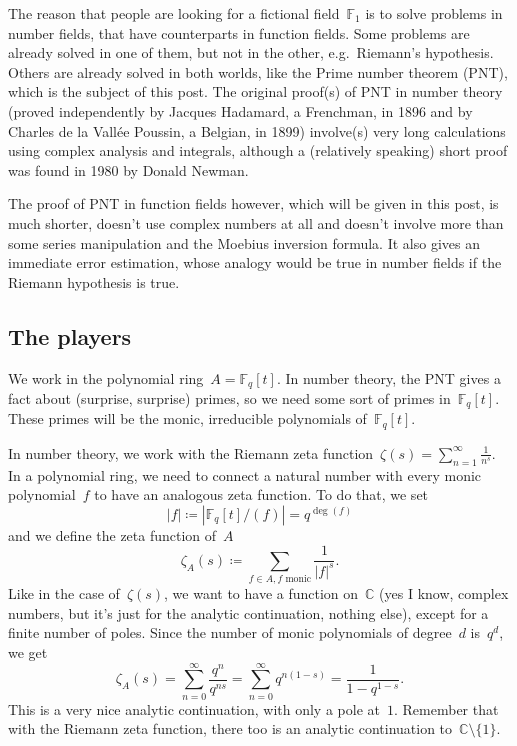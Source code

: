The reason that people are looking for a fictional field~$\mathbb{F}_1$ is to solve problems in number fields, that have counterparts in function fields. Some problems are already solved in one of them, but not in the other, e.g.\ Riemann's hypothesis. Others are already solved in both worlds, like the Prime number theorem (PNT), which is the subject of this post. The original proof(s) of PNT in number theory (proved independently by Jacques Hadamard, a Frenchman, in 1896 and by Charles de la Vall\'ee Poussin, a Belgian, in 1899) involve(s) very long calculations using complex analysis and integrals, although a (relatively speaking) short proof was found in 1980 by Donald Newman.

The proof of PNT in function fields however, which will be given in this post, is much shorter, doesn't use complex numbers at all and doesn't involve more than some series manipulation and the Moebius inversion formula. It also gives an immediate error estimation, whose analogy would be true in number fields if the Riemann hypothesis is true.

\subsection{The players}
We work in the polynomial ring~$A = \mathbb{F}_q[t]$. In number theory, the PNT gives a fact about (surprise, surprise) primes, so we need some sort of primes in $\mathbb{F}_q[t]$. These primes will be the monic, irreducible polynomials of~$\mathbb{F}_q[t]$.

In number theory, we work with the Riemann zeta function~$\zeta(s) = \sum_{n=1}^\infty \frac{1}{n^s}$. In a polynomial ring, we need to connect a natural number with every monic polynomial~$f$ to have an analogous zeta function. To do that, we set
\begin{equation}
  |f|\coloneqq|\mathbb{F}_q[t]/(f)| = q^{\deg(f)} 
\end{equation}
and we define the zeta function of~$A$
\begin{equation}
  \zeta_A(s)\coloneqq \sum_{f \in A,f \text{ monic}} \frac{1}{|f|^s}. 
\end{equation}
Like in the case of~$\zeta(s)$, we want to have a function on~$\mathbb{C}$ (yes I know, complex numbers, but it's just for the analytic continuation, nothing else), except for a finite number of poles. Since the number of monic polynomials of degree~$d$ is~$q^d$, we get
\begin{equation}
  \zeta_A(s) = \sum_{n=0}^\infty \frac{q^n}{q^{ns}}=\sum_{n=0}^\infty q^{n(1-s)} = \frac{1}{1-q^{1-s}}. 
\end{equation}
This is a very nice analytic continuation, with only a pole at~$1$. Remember that with the Riemann zeta function, there too is an analytic continuation to~$\mathbb{C}\setminus\{1\}$.

